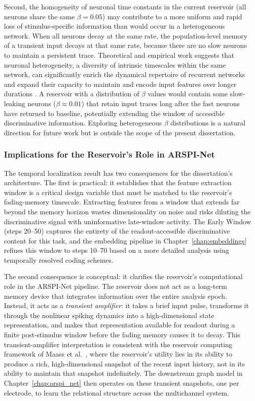 Second, the homogeneity of neuronal time constants in the current reservoir (all neurons share the same $\beta = 0.05$) may contribute to a more uniform and rapid loss of stimulus-specific information than would occur in a heterogeneous network. When all neurons decay at the same rate, the population-level memory of a transient input decays at that same rate, because there are no slow neurons to maintain a persistent trace. Theoretical and empirical work suggests that neuronal heterogeneity, a diversity of intrinsic timescales within the same network, can significantly enrich the dynamical repertoire of recurrent networks and expand their capacity to maintain and encode input features over longer durations \cite{Kim2024NeuralHeterogeneity}. A reservoir with a distribution of $\beta$ values would contain some slow-leaking neurons ($\beta \approx 0.01$) that retain input traces long after the fast neurons have returned to baseline, potentially extending the window of accessible discriminative information. Exploring heterogeneous $\beta$ distributions is a natural direction for future work but is outside the scope of the present dissertation.

\subsubsection{Implications for the Reservoir's Role in ARSPI-Net}

The temporal localization result has two consequences for the dissertation's architecture. The first is practical: it establishes that the feature extraction window is a critical design variable that must be matched to the reservoir's fading-memory timescale. Extracting features from a window that extends far beyond the memory horizon wastes dimensionality on noise and risks diluting the discriminative signal with uninformative late-window activity. The Early Window (steps 20--50) captures the entirety of the readout-accessible discriminative content for this task, and the embedding pipeline in Chapter~\ref{chap:embeddings} refines this window to steps 10--70 based on a more detailed analysis using temporally resolved coding schemes.

The second consequence is conceptual: it clarifies the reservoir's computational role in the ARSPI-Net pipeline. The reservoir does not act as a long-term memory device that integrates information over the entire analysis epoch. Instead, it acts as a \emph{transient amplifier}: it takes a brief input pulse, transforms it through the nonlinear spiking dynamics into a high-dimensional state representation, and makes that representation available for readout during a finite post-stimulus window before the fading memory causes it to decay. This transient-amplifier interpretation is consistent with the reservoir computing framework of Maass et al.\ \cite{Maass2002RealTime}, where the reservoir's utility lies in its ability to produce a rich, high-dimensional snapshot of the recent input history, not in its ability to maintain that snapshot indefinitely. The downstream graph model in Chapter~\ref{chap:arspi_net} then operates on these transient snapshots, one per electrode, to learn the relational structure across the multichannel system.


